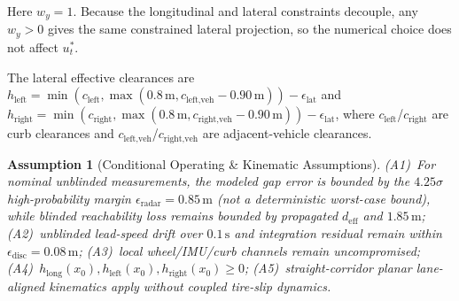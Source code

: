 \documentclass[journal]{IEEEtran}
\newtheorem{assumption}{Assumption}
\begin{document}
Here $w_y=1$. Because the longitudinal and lateral constraints decouple, any $w_y>0$ gives the same constrained lateral projection, so the numerical choice does not affect $u_t^*$.

The lateral effective clearances are
$h_{\text{left}}=\min(c_{\text{left}}, \max(0.8\,\text{m},c_{\text{left,veh}}-0.90\,\text{m}))-\epsilon_{\text{lat}}$ and
$h_{\text{right}}=\min(c_{\text{right}}, \max(0.8\,\text{m},c_{\text{right,veh}}-0.90\,\text{m}))-\epsilon_{\text{lat}}$,
where $c_{\text{left}}$/$c_{\text{right}}$ are curb clearances and $c_{\text{left,veh}}$/$c_{\text{right,veh}}$ are adjacent-vehicle clearances.

\begin{assumption}[Conditional Operating \& Kinematic Assumptions]
(A1)~For nominal unblinded measurements, the modeled gap error is bounded by the $4.25\sigma$ high-probability margin $\epsilon_{\text{radar}}=0.85\,\text{m}$ (not a deterministic worst-case bound), while blinded reachability loss remains bounded by propagated $d_{\text{eff}}$ and $1.85\,\text{m}$; (A2)~unblinded lead-speed drift over $0.1\,\text{s}$ and integration residual remain within $\epsilon_{\text{disc}}=0.08\,\text{m}$; (A3)~local wheel/IMU/curb channels remain uncompromised; (A4)~$h_{\text{long}}(x_0), h_{\text{left}}(x_0), h_{\text{right}}(x_0) \ge 0$; (A5)~straight-corridor planar lane-aligned kinematics apply without coupled tire-slip dynamics.
\end{assumption}
\end{document}
